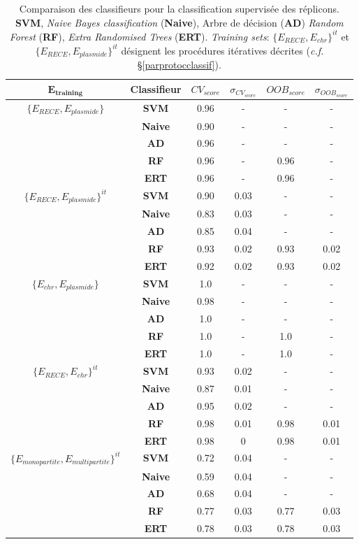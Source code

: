 \begin{table}[h]	  
	 \caption[Comparaison des classifieurs pour la classification supervisée des réplicons]{Comparaison des classifieurs pour la classification supervisée des réplicons. \textbf{SVM}, \textit{Naive Bayes classification} (\textbf{Naive}), Arbre de décision (\textbf{AD}) \textit{Random Forest} (\textbf{RF}), \textit{Extra Randomised Trees} (\textbf{ERT}). \textit{Training sets}: $\{E_{RECE},E_{chr}\}^{it}$ et $\{E_{RECE},E_{plasmide}\}^{it}$ désignent les procédures itératives décrites (\textit{c.f.} \S \ref{parprotocclassif}).} \label{tabresclassif}
	  \begin{small}
	  \begin{tabular}{c>{\bfseries}c|c|c|c|c}
	  $\mathbf{E_{training}}$&\textbf{Classifieur}& $CV_{score}$&$\sigma_{CV_{score}}$&$OOB_{score}$&$\sigma_{OOB_{score}}$\\
	  \hline
	  $\{E_{RECE},E_{plasmide}\}$ & SVM & 0.96 & - & - & - \\
	   & Naive & 0.90 & -&- &- \\
	   & AD & 0.96 & - & - & - \\
	   & RF & 0.96 & - & 0.96 & - \\
	   & ERT & 0.96 & - & 0.96 & - \\
	  \hline
	  $\{E_{RECE},E_{plasmide}\}^{it}$ & SVM & 0.90 & 0.03 & - & - \\
	   & Naive & 0.83 & 0.03& - & - \\
	   & AD & 0.85 & 0.04 & - & - \\
	   & RF & 0.93 & 0.02 & 0.93 & 0.02 \\
	   & ERT & 0.92 & 0.02 & 0.93 & 0.02 \\
	  \hline
	  $\{E_{chr},E_{plasmide}\}$ & SVM & 1.0 & - & - & - \\
	   & Naive & 0.98 & - & - & - \\
	   & AD & 1.0 & - & - & - \\
	   & RF & 1.0 & -& 1.0 & - \\
	   & ERT & 1.0 & - & 1.0 & - \\
	  \hline
	  $\{E_{RECE},E_{chr}\}^{it}$ & SVM & 0.93 & 0.02 & - & - \\
	   & Naive & 0.87 & 0.01& - & - \\
	   & AD & 0.95 & 0.02 & - & - \\
	   & RF & 0.98 & 0.01 & 0.98 & 0.01 \\
	   & ERT & 0.98 & 0 & 0.98 & 0.01 \\
	  \hline
	  $\{E_{monopartite},E_{multipartite}\}^{it}$ & SVM & 0.72 & 0.04 & - & - \\
	   & Naive & 0.59 & 0.04 & - & - \\
	   & AD & 0.68 & 0.04 & - & - \\
	   & RF & 0.77 & 0.03 & 0.77 & 0.03 \\
	   & ERT & 0.78 & 0.03 & 0.78 & 0.03 \\
	  \end{tabular}
	  \end{small}
\end{table}
	  
